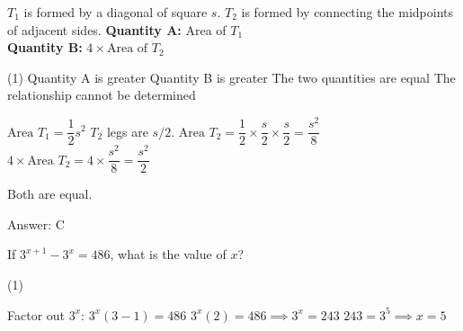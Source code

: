 \documentclass[11pt,paper=a4,answers]{exam}
\begin{document}
\begin{questions}
\question
\begin{center}
\end{center}
$T_1$ is formed by a diagonal of square $s$. $T_2$ is formed by connecting the midpoints of adjacent sides.
\vspace{5pt}
\textbf{Quantity A: } Area of $T_1$ \\
\vspace{5pt}
\textbf{Quantity B: } $4 \times \text{Area of } T_2$

\begin{tasks}(1)
\task[A)] Quantity A is greater
\task[B)] Quantity B is greater
\task[C)] The two quantities are equal
\task[D)] The relationship cannot be determined
\end{tasks}

\begin{solution}
\begin{center}
$\text{Area } T_1 = \dfrac{1}{2} s^2$
\vspace{5pt}
$T_2$ legs are $s/2$. $\text{Area } T_2 = \dfrac{1}{2} \times \dfrac{s}{2} \times \dfrac{s}{2} = \dfrac{s^2}{8}$
\vspace{10pt}
$4 \times \text{Area } T_2 = 4 \times \dfrac{s^2}{8} = \dfrac{s^2}{2}$
\end{center}
\vspace{5pt}
Both are equal.

Answer: \colorbox{yellow!100}{C}
\end{solution}

\vspace{1cm}


\question
If $3^{x+1} - 3^x = 486$, what is the value of $x$?

\begin{tasks}(1)
    
\end{tasks}

\begin{solution}
\begin{center}
Factor out $3^x$: $3^x(3 - 1) = 486$
\vspace{5pt}
$3^x(2) = 486 \implies 3^x = 243$
\vspace{5pt}
$243 = 3^5 \implies x = 5$
\end{center}


\end{solution}
\end{questions}
\end{document}

